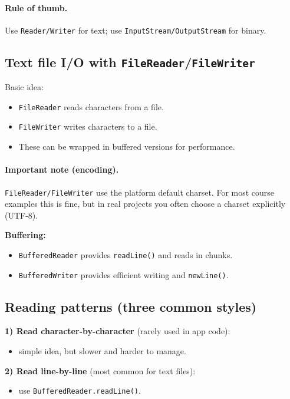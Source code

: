 \documentclass[11pt]{article}
\begin{document}
\paragraph{Rule of thumb.} Use \texttt{Reader/Writer} for text; use \texttt{InputStream/OutputStream} for binary.

\subsection{Text file I/O with \texttt{FileReader}/\texttt{FileWriter}}
Basic idea:
\begin{itemize}
  \item \texttt{FileReader} reads characters from a file.
  \item \texttt{FileWriter} writes characters to a file.
  \item These can be wrapped in buffered versions for performance.
\end{itemize}

\paragraph{Important note (encoding).}
\texttt{FileReader/FileWriter} use the platform default charset.
For most course examples this is fine, but in real projects you often choose a charset explicitly (UTF-8).

\textbf{Buffering:}
\begin{itemize}
  \item \texttt{BufferedReader} provides \texttt{readLine()} and reads in chunks.
  \item \texttt{BufferedWriter} provides efficient writing and \texttt{newLine()}.
\end{itemize}

\subsection{Reading patterns (three common styles)}
\textbf{1) Read character-by-character} (rarely used in app code):
\begin{itemize}
  \item simple idea, but slower and harder to manage.
\end{itemize}

\textbf{2) Read line-by-line} (most common for text files):
\begin{itemize}
  \item use \texttt{BufferedReader.readLine()}.
\end{itemize}
\end{document}
